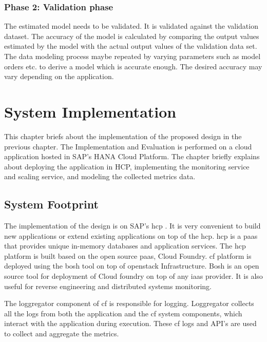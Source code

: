 \documentclass[article,type=msc,colorback,12pt,accentcolor=tud8b,table]{tudthesis}
\begin{document}
\subsubsection{Phase 2: Validation phase}

The estimated model needs to be validated. It is validated against the validation dataset. The accuracy of the model is calculated by comparing the output values estimated by the model with the actual output values of the validation data set. The data modeling process maybe repeated by varying parameters such as model orders etc. to derive a model which is accurate enough. The desired accuracy may vary depending on the application.




 \cleardoublepage
 
 \hfill  
 \section{System Implementation}
 \hfill \break
 
This chapter briefs about the implementation of the proposed design in the previous chapter. The Implementation and Evaluation is performed on a cloud application hosted in SAP's HANA Cloud Platform. The chapter briefly explains about deploying the application in HCP, implementing the monitoring service and scaling service, and modeling the collected metrics data.

\subsection{System Footprint}
The implementation of the design is on SAP's \gls{hcp} \cite{hcp}. It is very convenient to build new applications or extend existing applications on top of the \gls{hcp}. \gls{hcp} is a \gls{paas} that provides unique in-memory databases and application services. The \gls{hcp} platform is built based on the open source \gls{paas}, Cloud Foundry. \gls{cf} platform is deployed using the bosh tool on top of openstack Infrastructure. Bosh is an open source tool for deployment of Cloud foundry on top of any \gls{iaas} provider. It is also useful for reverse engineering and distributed systems monitoring.

The loggregator component of \gls{cf} is responsible for logging. Loggregator collects all the logs from both the application and the \gls{cf} system components, which interact with the application during execution. These \gls{cf} logs and API's are used to collect and aggregate the metrics. 
\end{document}
